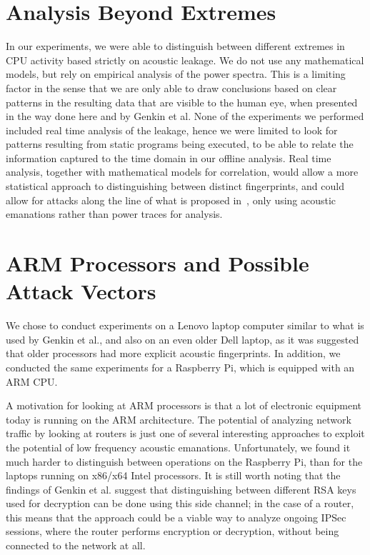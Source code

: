 \section{Analysis Beyond Extremes}
In our experiments, we were able to distinguish between different extremes in \gls{CPU} activity based strictly on acoustic leakage. 
We do not use any mathematical models, but rely on empirical analysis of the power spectra. 
This is a limiting factor in the sense that we are only able to draw conclusions based on clear patterns in the resulting data that are visible to the human eye, when presented in the way done here and by Genkin et al.
None of the experiments we performed included real time analysis of the leakage, hence we were limited to look for patterns resulting from static programs being executed, to be able to relate the information captured to the time domain in our offline analysis.
Real time analysis, together with mathematical models for correlation, would allow a more statistical approach to distinguishing between distinct fingerprints, and could allow for attacks along the line of what is proposed in~\cite{DBLP:conf/crypto/KocherJJ99}, only using acoustic emanations rather than power traces for analysis.


\section{ARM Processors and Possible Attack Vectors}
We chose to conduct experiments on a Lenovo laptop computer similar to what is used by Genkin et al., and also on an even older Dell laptop, as it was suggested that older processors had more explicit acoustic fingerprints.
In addition, we conducted the same experiments for a Raspberry Pi, which is equipped with an ARM \gls{CPU}.

A motivation for looking at ARM processors is that a lot of electronic equipment today is running on the ARM architecture.
The potential of analyzing network traffic by looking at routers is just one of several interesting approaches to exploit the potential of low frequency acoustic emanations.
Unfortunately, we found it much harder to distinguish between operations on the Raspberry Pi, than for the laptops running on x86/x64 Intel processors.
It is still worth noting that the findings of Genkin et al. suggest that distinguishing between different RSA keys used for decryption can be done using this side channel; in the case of a router, this means that the approach could be a viable way to analyze ongoing IPSec sessions, where the router performs encryption or decryption, without being connected to the network at all.



